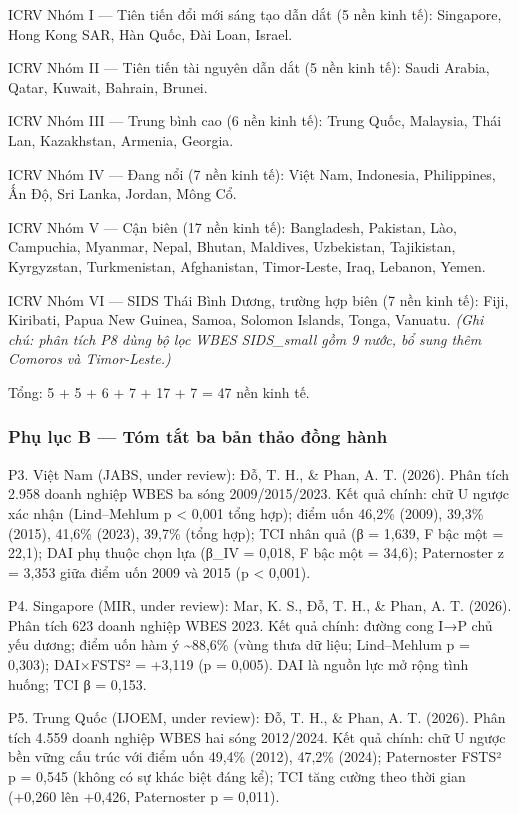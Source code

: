 \documentclass[12pt,a4paper]{article}
\begin{document}
ICRV Nhóm I --- Tiên tiến đổi mới sáng tạo dẫn dắt (5 nền kinh tế):
Singapore, Hong Kong SAR, Hàn Quốc, Đài Loan, Israel.

ICRV Nhóm II --- Tiên tiến tài nguyên dẫn dắt (5 nền kinh tế): Saudi
Arabia, Qatar, Kuwait, Bahrain, Brunei.

ICRV Nhóm III --- Trung bình cao (6 nền kinh tế): Trung Quốc, Malaysia,
Thái Lan, Kazakhstan, Armenia, Georgia.

ICRV Nhóm IV --- Đang nổi (7 nền kinh tế): Việt Nam, Indonesia,
Philippines, Ấn Độ, Sri Lanka, Jordan, Mông Cổ.

ICRV Nhóm V --- Cận biên (17 nền kinh tế): Bangladesh, Pakistan, Lào,
Campuchia, Myanmar, Nepal, Bhutan, Maldives, Uzbekistan, Tajikistan,
Kyrgyzstan, Turkmenistan, Afghanistan, Timor-Leste, Iraq, Lebanon,
Yemen.

ICRV Nhóm VI --- SIDS Thái Bình Dương, trường hợp biên (7 nền kinh tế):
Fiji, Kiribati, Papua New Guinea, Samoa, Solomon Islands, Tonga,
Vanuatu. \emph{(Ghi chú: phân tích P8 dùng bộ lọc WBES SIDS\_small gồm 9
nước, bổ sung thêm Comoros và Timor-Leste.)}

Tổng: 5 + 5 + 6 + 7 + 17 + 7 = 47 nền kinh tế.

\hypertarget{phux1ee5-lux1ee5c-b--tuxf3m-tux1eaft-ba-bux1ea3n-thux1ea3o-ux111ux1ed3ng-huxe0nh}{%
\subsubsection{Phụ lục B --- Tóm tắt ba bản thảo đồng
hành}\label{phux1ee5-lux1ee5c-b--tuxf3m-tux1eaft-ba-bux1ea3n-thux1ea3o-ux111ux1ed3ng-huxe0nh}}

P3. Việt Nam (JABS, under review): Đỗ, T. H., \& Phan, A. T. (2026).
Phân tích 2.958 doanh nghiệp WBES ba sóng 2009/2015/2023. Kết quả chính:
chữ U ngược xác nhận (Lind--Mehlum p \textless{} 0,001 tổng hợp); điểm
uốn 46,2\% (2009), 39,3\% (2015), 41,6\% (2023), 39,7\% (tổng hợp); TCI
nhân quả (β = 1,639, F bậc một = 22,1); DAI phụ thuộc chọn lựa (β\_IV =
0,018, F bậc một = 34,6); Paternoster z = 3,353 giữa điểm uốn 2009 và
2015 (p \textless{} 0,001).

P4. Singapore (MIR, under review): Mar, K. S., Đỗ, T. H., \& Phan, A. T.
(2026). Phân tích 623 doanh nghiệp WBES 2023. Kết quả chính: đường cong
I→P chủ yếu dương; điểm uốn hàm ý \textasciitilde88,6\% (vùng thưa dữ
liệu; Lind--Mehlum p = 0,303); DAI×FSTS² = +3,119 (p = 0,005). DAI là
nguồn lực mở rộng tình huống; TCI β = 0,153.

P5. Trung Quốc (IJOEM, under review): Đỗ, T. H., \& Phan, A. T. (2026).
Phân tích 4.559 doanh nghiệp WBES hai sóng 2012/2024. Kết quả chính: chữ
U ngược bền vững cấu trúc với điểm uốn 49,4\% (2012), 47,2\% (2024);
Paternoster FSTS² p = 0,545 (không có sự khác biệt đáng kể); TCI tăng
cường theo thời gian (+0,260 lên +0,426, Paternoster p = 0,011).
\end{document}
